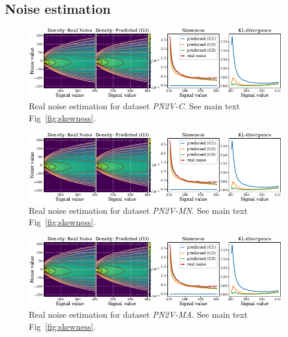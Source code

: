 \documentclass{article}
\begin{document}
\subsection{Noise estimation}
\label{si:skewness}
\begin{figure}[ht]
\begin{center}
\centerline{\includegraphics[width=\columnwidth]{fig_skewness_1col_w2s-1.pdf}}
\caption{Real noise estimation for dataset \textit{PN2V-C}. See main text Fig~\ref{fig:skewness}.
}
\end{center}
\vskip -0.2in
\end{figure}

\begin{figure}[ht]
\begin{center}
\centerline{\includegraphics[width=\columnwidth]{fig_skewness_1col_w2s-1.pdf}}
\caption{Real noise estimation for dataset \textit{PN2V-MN}. See main text Fig~\ref{fig:skewness}.
}
\end{center}
\vskip -0.2in
\end{figure}

\begin{figure}[ht]
\begin{center}
\centerline{\includegraphics[width=\columnwidth]{fig_skewness_1col_w2s-1.pdf}}
\caption{Real noise estimation for dataset \textit{PN2V-MA}. See main text Fig~\ref{fig:skewness}.
}
\end{center}
\vskip -0.2in
\end{figure}
\end{document}
